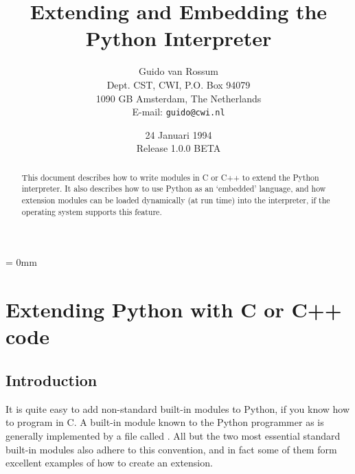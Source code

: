 
\title{\bf Extending and Embedding the Python Interpreter}

\author{
	Guido van Rossum \\
	Dept. CST, CWI, P.O. Box 94079 \\
	1090 GB Amsterdam, The Netherlands \\
	E-mail: {\tt guido@cwi.nl}
}

\date{24 Januari 1994 \\ Release 1.0.0 BETA} %

\makeindex




\maketitle

\begin{abstract}

\noindent
This document describes how to write modules in C or C++ to extend the
Python interpreter.  It also describes how to use Python as an
`embedded' language, and how extension modules can be loaded
dynamically (at run time) into the interpreter, if the operating
system supports this feature.

\end{abstract}

\pagebreak

{
\parskip = 0mm
\tableofcontents
}

\pagebreak



\chapter{Extending Python with C or C++ code}


\section{Introduction}

It is quite easy to add non-standard built-in modules to Python, if
you know how to program in C.  A built-in module known to the Python
programmer as  is generally implemented by a file called
.  All but the two most essential standard built-in
modules also adhere to this convention, and in fact some of them form
excellent examples of how to create an extension.

